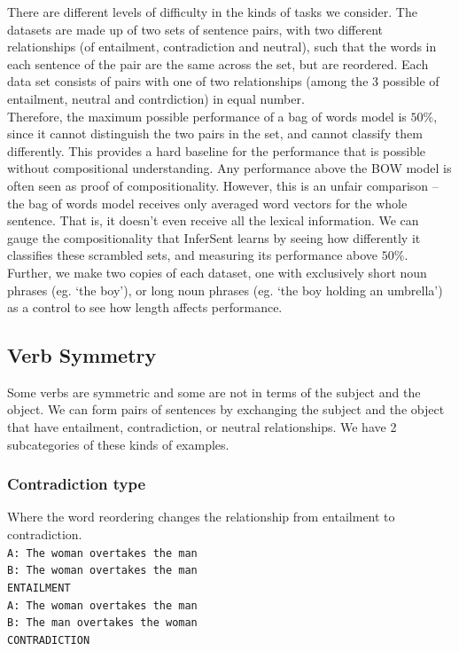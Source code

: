\documentclass[10pt,letterpaper]{article}
\begin{document}
There are different levels of difficulty in the kinds of tasks we consider. The datasets are made up of two sets of sentence pairs, with two different relationships (of entailment, contradiction and neutral), such that the words in each sentence of the pair are the same across the set, but are reordered. Each data set consists of pairs with one of two relationships (among the 3 possible of entailment, neutral and contrdiction) in equal number.\\
Therefore, the maximum possible performance of a bag of words model is $50\%$, since it cannot distinguish the two pairs in the set, and cannot classify them differently. This provides a hard baseline for the performance that is possible without compositional understanding. Any performance above the BOW model is often seen as proof of compositionality. However, this is an unfair comparison – the bag of words model receives only averaged word vectors for the whole sentence. That is, it doesn't even receive all the lexical information.  We can gauge the compositionality that InferSent learns by seeing how differently it classifies these scrambled sets, and measuring its performance above $50\%$. Further, we make two copies of each dataset, one with exclusively short noun phrases (eg. `the boy'), or long noun phrases (eg. `the boy holding an umbrella') as a control to see how length affects performance.

\subsection{Verb Symmetry}

Some verbs are symmetric and some are not in terms of the subject and the object. We can form pairs of sentences by exchanging the subject and the object that have entailment, contradiction, or neutral relationships. We have 2 subcategories of these kinds of examples.

\subsubsection{Contradiction type}
Where the word reordering changes the relationship from entailment to contradiction.\\
{ \tt A: The woman overtakes the man \\ B: The woman overtakes the man \\ ENTAILMENT \\}{\tt A: The woman overtakes the man \\ B: The man overtakes the woman \\ CONTRADICTION }
\end{document}
